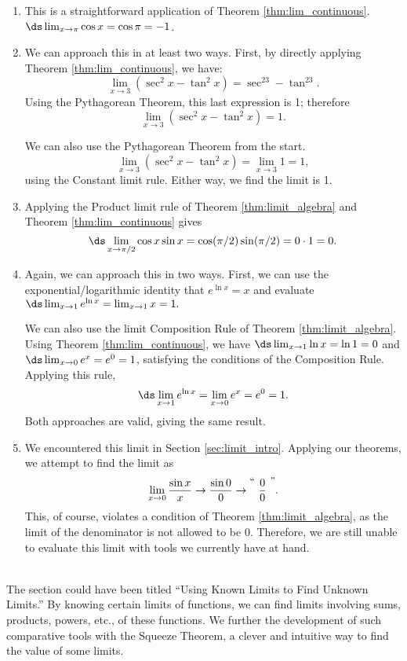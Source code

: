 {
\begin{enumerate}
\item		This is a straightforward application of Theorem \ref{thm:lim_continuous}. $\ds \lim_{x\to \pi} \cos x = \cos \pi = -1$.
\item		We can approach this in at least two ways. First, by directly applying Theorem \ref{thm:lim_continuous}, we have:
				$$\lim_{x\to 3} (\sec^2x - \tan^2 x) = \sec^23-\tan^23.$$ Using the Pythagorean Theorem, this last expression is 1; therefore $$\lim_{x\to 3} (\sec^2x - \tan^2 x) = 1.$$
				
				We can also use the Pythagorean Theorem from the start. $$\lim_{x\to 3} (\sec^2x - \tan^2 x) = \lim_{x\to 3} 1 = 1,$$ using the Constant limit rule. Either way, we find the limit is 1.
				
\item		Applying the Product limit rule of Theorem \ref{thm:limit_algebra} and Theorem \ref{thm:lim_continuous} gives $$\ds \lim_{x\to \pi/2} \cos x\sin x = \cos (\pi/2)\sin(\pi/2) = 0\cdot 1 = 0.$$

\item		Again, we can approach this in two ways. First, we can use the exponential/logarithmic identity that $e^{\ln x} = x$ and evaluate $\ds \lim_{x\to 1} e^{\ln x} = \lim_{x\to 1} x = 1.$ 

We can also use the limit Composition Rule of Theorem \ref{thm:limit_algebra}. Using Theorem \ref{thm:lim_continuous}, we have $\ds \lim_{x\to 1}\ln x = \ln 1 = 0$ and $\ds\lim_{x\to 0} e^x= e^0=1$, satisfying the conditions of the Composition Rule. Applying this rule, $$\ds \lim_{x\to 1} e^{\ln x} = \lim_{x\to 0} e^x = e^0 = 1.$$ Both approaches are valid, giving the same result.

\item		We encountered this limit in Section \ref{sec:limit_intro}. Applying our theorems, we attempt to find the limit as $$\lim_{x\to 0}\frac{\sin x}{x}\rightarrow \frac{\sin 0}{0} \rightarrow \raisebox{8pt}{\text{``\ }}\frac{0}{0}\raisebox{8pt}{\text{\ ''}}.$$ This, of course, violates a condition of Theorem \ref{thm:limit_algebra}, as the limit of the denominator is not allowed to be 0. Therefore, we are still unable to evaluate this limit with tools we currently have at hand.
\end{enumerate}
\baselineskip
}\\

The section could have been titled ``Using Known Limits to Find Unknown Limits.'' By knowing certain limits of functions, we can find limits involving sums, products, powers, etc., of these functions. We further the development of such comparative tools with the Squeeze Theorem, a clever and intuitive way to find the value of some limits. 

